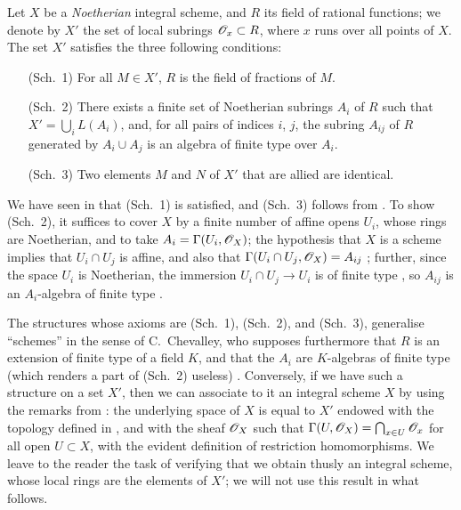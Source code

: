 \begin{env}[8.3.1]
\label{1.8.3.1}
Let $X$ be a \emph{Noetherian} integral scheme, and $R$ its
field of rational functions; we denote by $X'$ the set of local subrings
$\mathscr{O}_x\subset R$, where $x$ runs over all points of $X$. The set $X'$ satisfies
the three following conditions:
\begin{enumerate}
  \item[(Sch.~1)] For all $M\in X'$, $R$ is the field of fractions of $M$.
  \item[(Sch.~2)] There exists a finite set of Noetherian subrings $A_i$ of $R$
    such that $X'=\bigcup_i L(A_i)$, and, for all pairs of indices $i$, $j$, the subring
    $A_{ij}$ of $R$ generated by $A_i\cup A_j$ is an algebra of finite type over $A_i$.
  \item[(Sch.~3)] Two elements $M$ and $N$ of $X'$ that are allied are identical.
\end{enumerate}
\end{env}

We have seen in  that (Sch.~1) is satisfied, and (Sch.~3)
follows from . To show (Sch.~2), it suffices to cover $X$ by a
finite number of affine opens $U_i$, whose rings are Noetherian, and to take
$A_i=\Gamma(U_i,\mathscr{O}_X)$; the hypothesis that $X$ is a scheme implies that
$U_i\cap U_j$ is affine, and also that $\Gamma(U_i\cap U_j,\mathscr{O}_X)=A_{ij}$
; further, since the space $U_i$ is Noetherian, the immersion
$U_i\cap U_j\to U_i$ is of finite type , so $A_{ij}$ is an
$A_i$-algebra of finite type .

\begin{env}[8.3.2]
\label{1.8.3.2}
The structures whose axioms are (Sch.~1), (Sch.~2), and
(Sch.~3), generalise ``schemes'' in the sense of C.~Chevalley, who supposes
furthermore that $R$ is an extension of finite type of a field $K$, and that the
$A_i$ are $K$-algebras of finite type (which renders a part of (Sch.~2) useless)
\cite{I-1}. Conversely, if we have such a structure on a set $X'$, then we can
associate to it an integral scheme $X$ by using the remarks from :
the underlying space of $X$ is equal to $X'$ endowed with the topology defined
in , and with the sheaf $\mathscr{O}_X$ such that
$\Gamma(U,\mathscr{O}_X)=\bigcap_{x\in U}\mathscr{O}_x$ for all open $U\subset X$, with the
evident definition of restriction homomorphisms. We leave to the reader the
task of verifying that we obtain thusly an integral scheme, whose local rings
are the elements of $X'$; we will not use this result in what follows.
\end{env}

